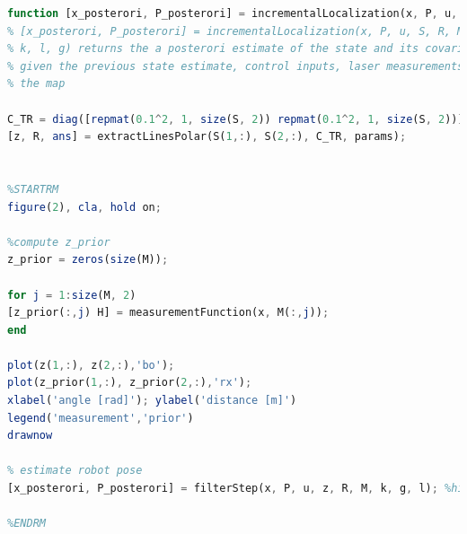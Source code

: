 \begin{lstlisting}[language=Octave]
function [x_posterori, P_posterori] = incrementalLocalization(x, P, u, S, M, params, k, g, l)
% [x_posterori, P_posterori] = incrementalLocalization(x, P, u, S, R, M,
% k, l, g) returns the a posterori estimate of the state and its covariance,
% given the previous state estimate, control inputs, laser measurements and
% the map

C_TR = diag([repmat(0.1^2, 1, size(S, 2)) repmat(0.1^2, 1, size(S, 2))]);
[z, R, ans] = extractLinesPolar(S(1,:), S(2,:), C_TR, params);


%STARTRM
figure(2), cla, hold on;

%compute z_prior
z_prior = zeros(size(M));

for j = 1:size(M, 2)
[z_prior(:,j) H] = measurementFunction(x, M(:,j));
end

plot(z(1,:), z(2,:),'bo');
plot(z_prior(1,:), z_prior(2,:),'rx');
xlabel('angle [rad]'); ylabel('distance [m]')
legend('measurement','prior')
drawnow

% estimate robot pose
[x_posterori, P_posterori] = filterStep(x, P, u, z, R, M, k, g, l); %hint: you just coded this function

%ENDRM
\end{lstlisting}

